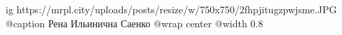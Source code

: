  
 
 
 
 

\ifcmt
  ig https://mrpl.city/uploads/posts/resize/w/750x750/2fhpjitugzpwjsme.JPG
	@caption Рена Ильинична Саенко
  @wrap center
  @width 0.8
\fi
